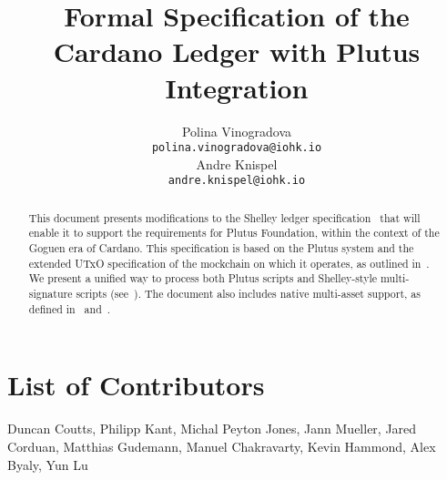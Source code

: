 

\cleardoublepage
\renewcommand{\thepage}{\arabic{page}}
\setcounter{page}{1}

\title{Formal Specification of the Cardano Ledger with Plutus
Integration}

\author{
   Polina Vinogradova \\ {\small \texttt{polina.vinogradova@iohk.io}} \\
   Andre Knispel \\ {\small \texttt{andre.knispel@iohk.io}} \\
   }

\date{}

\maketitle

\begin{abstract}
This document presents modifications to the Shelley ledger
specification~\cite{shelley_spec} that will enable it to support the requirements for Plutus Foundation, within the context of the Goguen era
of Cardano. This specification is based on the Plutus system and the extended
UTxO specification of the mockchain on which it operates, as outlined in~\cite{plutus_eutxo}.
%
We present a unified way to process both Plutus scripts and Shelley-style multi-signature scripts
(see~\cite{multi_sig}). The document also includes native multi-asset support,
as defined in~\cite{multi_currency} and~\cite{formal_multicur}.
\end{abstract}

\section*{List of Contributors}
\label{acknowledgements}

Duncan Coutts,
Philipp Kant,
Michal Peyton Jones,
Jann Mueller,
Jared Corduan,
Matthias Gudemann,
Manuel Chakravarty,
Kevin Hammond,
Alex Byaly,
Yun Lu
